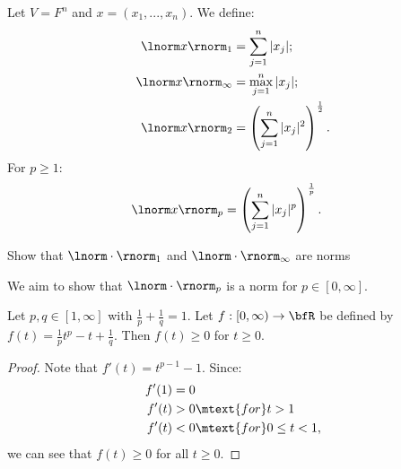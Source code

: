     \begin{example}
        Let $V = F^n$ and $x = (x_1,...,x_n)$. We define:
            \begin{equation*}
            \begin{split}
                \lnorm x \rnorm_1 &= \sum_{j  =1}^n |x_j|; \\
                \lnorm x \rnorm_\infty & = \max_{j=1}^n |x_j|; \\
                \lnorm x \rnorm_2 & = \left( \sum_{j = 1}^n |x_j|^2 \right)^{\frac{1}{2}}.
            \end{split}
            \end{equation*}
        For $p \geq 1$:
            \begin{equation*}
            \begin{split}
                \lnorm x \rnorm_p & = \left( \sum_{j = 1}^n |x_j|^p \right)^\frac{1}{p}.
            \end{split}
            \end{equation*}
    \end{example}

    \begin{exercise}
        Show that $\lnorm \cdot \rnorm_1$ and $\lnorm \cdot \rnorm_\infty$ are norms 
    \end{exercise}

    \begin{center}
    \end{center}

    We aim to show that $\lnorm \cdot \rnorm_p$ is a norm for $p \in [0,\infty]$.

    \begin{lemma}\label{lemma:lemnorm1}
        Let $p,q \in [1,\infty]$ with $\frac{1}{p} + \frac{1}{q} = 1$. Let $f:[0,\infty) \rightarrow \bfR$ be defined by $f(t) = \frac{1}{p}t^p - t + \frac{1}{q}$. Then $f(t) \geq 0$ for $t \geq 0$.
    \end{lemma}
        \begin{proof}
            Note that $f'(t) = t^{p-1} - 1$. Since:
                \begin{equation*}
                \begin{split}
                    f'(1) &= 0 \\
                    f'(t) &> 0 \mtext{for} t>1 \\
                    f'(t) &<0 \mtext{for} 0\leq t < 1,
                \end{split}
                \end{equation*}
            we can see that $f(t) \geq 0$ for all $t \geq 0$.
        \end{proof}

